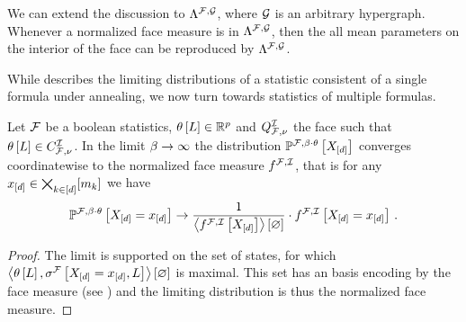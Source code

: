 We can extend the discussion to $\Lambda^{\mathcal{F},\mathcal{G}}$, where $\mathcal{G}$ is an arbitrary hypergraph.
Whenever a normalized face measure is in $\Lambda^{\mathcal{F},\mathcal{G}}$, then the all mean parameters on the interior of the face can be reproduced by $\Lambda^{\mathcal{F},\mathcal{G}}$.

%

\label{sec:hardLogicLimit}

While  describes the limiting distributions of a statistic consistent of a single formula under annealing, we now turn towards statistics of multiple formulas.

\begin{theorem}
    \label{the:limitingDistribution}
    Let $\mathcal{F}$ be a boolean statistics, $\theta\left[L\right]\in\mathbb{R}^{p}$ and $Q^{\mathcal{I}}_{\mathcal{F},\nu}$ the face such that $\theta\left[L\right]\in C_{\mathcal{F},\nu}^{\mathcal{I}}$.
    In the limit $\beta\rightarrow\infty$ the distribution $\mathbb{P}^{\mathcal{F},\beta\cdot\theta}\left[X_{[d]}\right]$ converges coordinatewise to the normalized face measure $f^{\mathcal{F},\mathcal{I}}$, that is for any $x_{[d]}\in\bigtimes_{k\in[d]}[m_{k}]$ we have
    \begin{align*}
        \mathbb{P}^{\mathcal{F},\beta\cdot\theta}\left[X_{[d]}=x_{[d]}\right]
        \rightarrow \frac{1}{\left\langle f^{\mathcal{F},\mathcal{I}}\left[X_{[d]}\right]\right\rangle \left[ \varnothing \right]} \cdot f^{\mathcal{F},\mathcal{I}}\left[X_{[d]}=x_{[d]}\right] \, .
    \end{align*}
\end{theorem}
\begin{proof}
    The limit is supported on the set of states, for which $\left\langle \theta\left[L\right],\sigma^{\mathcal{F}}\left[X_{[d]}=x_{[d]},L\right]\right\rangle \left[ \varnothing \right]$ is maximal.
    This set has an basis encoding by the face measure (see ) and the limiting distribution is thus the normalized face measure.
\end{proof}

